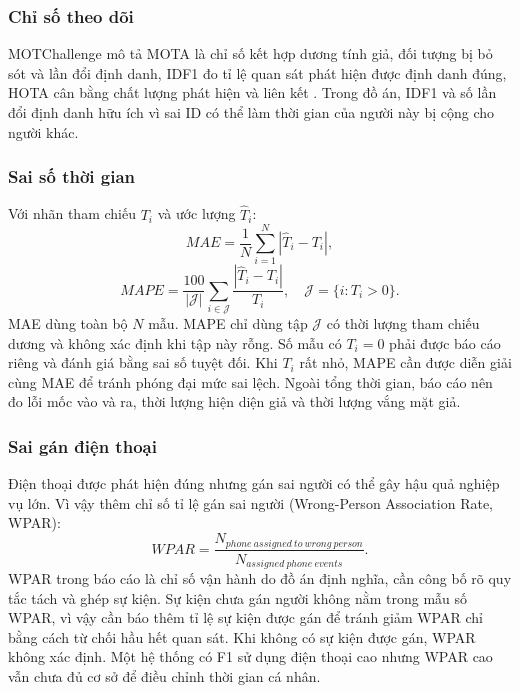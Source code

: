 \subsubsection{Chỉ số theo dõi}
MOTChallenge mô tả MOTA là chỉ số kết hợp dương tính giả, đối tượng bị bỏ sót và lần đổi định danh, IDF1 đo tỉ lệ quan sát phát hiện được định danh đúng, HOTA cân bằng chất lượng phát hiện và liên kết \cite{motmetrics,idmetrics,hota}. Trong đồ án, IDF1 và số lần đổi định danh hữu ích vì sai ID có thể làm thời gian của người này bị cộng cho người khác.

\subsubsection{Sai số thời gian}
Với nhãn tham chiếu $T_i$ và ước lượng $\hat{T}_i$:
\begin{equation}
 MAE=\frac{1}{N}\sum_{i=1}^{N}|\hat{T}_i-T_i|,
 \label{eq:mae}
\end{equation}
\begin{equation}
 MAPE=\frac{100}{|\mathcal{J}|}\sum_{i\in\mathcal{J}}\frac{|\hat{T}_i-T_i|}{T_i},\quad\mathcal{J}=\{i:T_i>0\}.
 \label{eq:mape}
\end{equation}
MAE dùng toàn bộ $N$ mẫu. MAPE chỉ dùng tập $\mathcal{J}$ có thời lượng tham chiếu dương và không xác định khi tập này rỗng. Số mẫu có $T_i=0$ phải được báo cáo riêng và đánh giá bằng sai số tuyệt đối. Khi $T_i$ rất nhỏ, MAPE cần được diễn giải cùng MAE để tránh phóng đại mức sai lệch. Ngoài tổng thời gian, báo cáo nên đo lỗi mốc vào và ra, thời lượng hiện diện giả và thời lượng vắng mặt giả.

\subsubsection{Sai gán điện thoại}
Điện thoại được phát hiện đúng nhưng gán sai người có thể gây hậu quả nghiệp vụ lớn. Vì vậy thêm chỉ số tỉ lệ gán sai người (Wrong-Person Association Rate, WPAR):
\begin{equation}
 WPAR=\frac{N_{phone\ assigned\ to\ wrong\ person}}{N_{assigned\ phone\ events}}.
\end{equation}
WPAR trong báo cáo là chỉ số vận hành do đồ án định nghĩa, cần công bố rõ quy tắc tách và ghép sự kiện. Sự kiện chưa gán người không nằm trong mẫu số WPAR, vì vậy cần báo thêm tỉ lệ sự kiện được gán để tránh giảm WPAR chỉ bằng cách từ chối hầu hết quan sát. Khi không có sự kiện được gán, WPAR không xác định. Một hệ thống có F1 sử dụng điện thoại cao nhưng WPAR cao vẫn chưa đủ cơ sở để điều chỉnh thời gian cá nhân.


